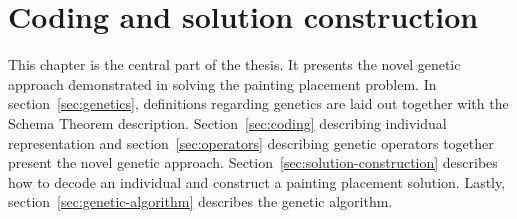 \chapter{Coding and solution construction}\label{ch:coding-and-solution-construction}

This chapter is the central part of the thesis.
It presents the novel genetic approach demonstrated in solving the painting placement problem.
In section~\ref{sec:genetics}, definitions regarding genetics are laid out together with the Schema Theorem description.
Section~\ref{sec:coding} describing individual representation and section~\ref{sec:operators}
describing genetic operators together present the novel genetic approach.
Section~\ref{sec:solution-construction} describes how to decode an individual and construct a painting placement solution.
Lastly, section~\ref{sec:genetic-algorithm} describes the genetic algorithm.







